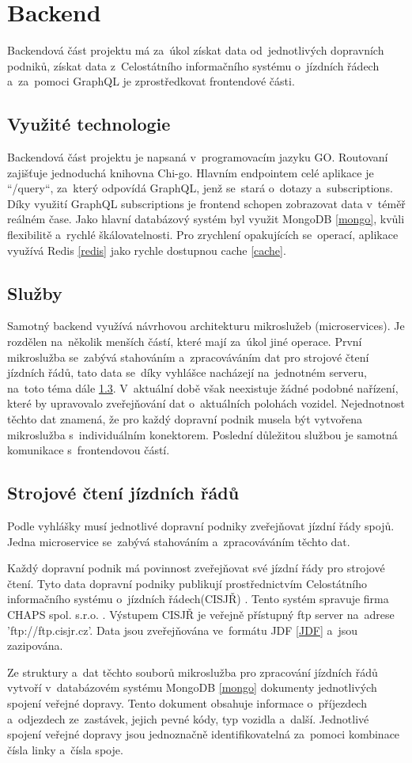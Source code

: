 \section{Backend}
Backendová část projektu má za~úkol získat data od~jednotlivých dopravních podniků, získat data z~Celostátního informačního systému o~jízdních řádech \cite{cisjr} a~za~pomoci GraphQL je zprostředkovat frontendové části.
\subsection{Využité technologie} Backendová část projektu je napsaná v~programovacím jazyku GO. Routovaní zajišťuje jednoduchá knihovna Chi-go. Hlavním endpointem celé aplikace je “/query“, za~který odpovídá GraphQL, jenž se~stará o~dotazy a~subscriptions. Díky využití GraphQL subscriptions je frontend schopen zobrazovat data v~téměř reálném čase. Jako hlavní databázový systém byl využit MongoDB \ref{mongo}, kvůli flexibilitě a~rychlé škálovatelnosti. Pro zrychlení opakujících se~operací, aplikace využívá Redis \ref{redis} jako rychle dostupnou cache \ref{cache}. \par
\subsection{Služby}
Samotný backend využívá návrhovou architekturu mikroslužeb (microservices). Je rozdělen na~několik menších částí, které mají za~úkol jiné operace. První mikroslužba se~zabývá stahováním a~zpracováváním dat pro strojové čtení jízdních řádů, tato data se~díky vyhlášce \cite{vyhlaskaJizdniRady} nacházejí na~jednotném serveru, na~toto téma dále \ref{strojoveCteniJR}. V~aktuální době však neexistuje žádné podobné nařízení, které by upravovalo zveřejňování dat o~aktuálních polohách vozidel. Nejednotnost těchto dat znamená, že pro každý dopravní podnik musela být vytvořena mikroslužba s~individuálním konektorem. Poslední důležitou službou je samotná komunikace s~frontendovou částí.
\subsection [Jízdní řády]{Strojové čtení jízdních řádů} \label{strojoveCteniJR}
Podle vyhlášky \cite{vyhlaskaJizdniRady} musí jednotlivé dopravní podniky zveřejňovat jízdní řády spojů. Jedna microservice se~zabývá stahováním a~zpracováváním těchto dat. \par
Každý dopravní podnik má povinnost zveřejňovat své jízdní řády pro strojové čtení. Tyto data dopravní podniky publikují prostřednictvím Celostátního informačního systému o~jízdních řádech(CISJŘ) \cite{cisjr}. Tento systém spravuje firma CHAPS spol. s.r.o. \cite{chaps}. Výstupem CISJŘ je veřejně přístupný ftp server na~adrese 'ftp://ftp.cisjr.cz'. Data jsou zveřejňována ve~formátu JDF \ref{JDF} a~jsou zazipována. \par
Ze struktury a~dat těchto souborů mikroslužba pro zpracování jízdních řádů vytvoří v~databázovém systému MongoDB \ref{mongo} dokumenty jednotlivých spojení veřejné dopravy. Tento dokument obsahuje informace o~příjezdech a~odjezdech ze~zastávek, jejich pevné kódy, typ vozidla a~další. Jednotlivé spojení veřejné dopravy jsou jednoznačně identifikovatelná za~pomoci kombinace čísla linky a~čísla spoje.
